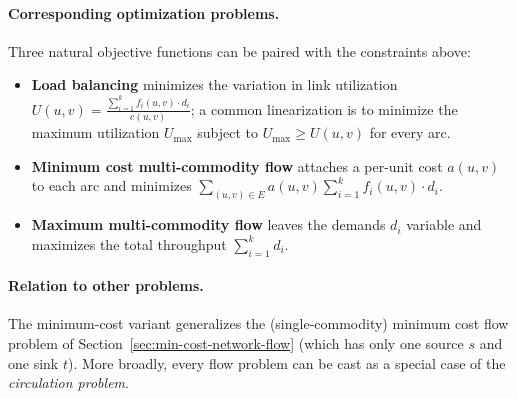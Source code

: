 \paragraph{Corresponding optimization problems.}
Three natural objective functions can be paired with the constraints above:
\begin{itemize}
\item \textbf{Load balancing} minimizes the variation in link utilization \(U(u,v) = \tfrac{\sum_{i=1}^{k} f_i(u,v) \cdot d_i}{c(u,v)}\); a common linearization is to minimize the maximum utilization \(U_{\max}\) subject to \(U_{\max} \geq U(u,v)\) for every arc.
\item \textbf{Minimum cost multi-commodity flow} attaches a per-unit cost \(a(u,v)\) to each arc and minimizes \(\sum_{(u,v)\in E} a(u,v) \sum_{i=1}^{k} f_i(u,v) \cdot d_i\).
\item \textbf{Maximum multi-commodity flow} leaves the demands \(d_i\) variable and maximizes the total throughput \(\sum_{i=1}^{k} d_i\).
\end{itemize}

\paragraph{Relation to other problems.}
The minimum-cost variant generalizes the (single-commodity) minimum cost flow problem of Section~\ref{sec:min-cost-network-flow} (which has only one source \(s\) and one sink \(t\)). More broadly, every flow problem can be cast as a special case of the \emph{circulation problem}.

